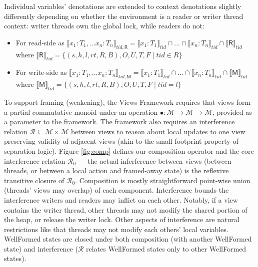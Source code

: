 Individual variables' denotations are extended to context denotations slightly differently depending on whether the environment is a reader or writer thread context: writer threads own the global lock, while readers do not:
\begin{itemize}
\item For read-side as $\llbracket x_1 : T_1, \ldots x_n : T_n \rrbracket_{tid,\textsf{R}} = \llbracket x_1 : T_1 \rrbracket_{tid} \cap \ldots \cap \llbracket x_n : T_n \rrbracket_{tid} \cap \llbracket \textsf{R} \rrbracket_{tid}$ where
$\llbracket \textsf{R} \rrbracket_{tid} = \{ (s,h,l,rt,R,B),O,U,T,F  \mid tid \in R \}$

\item For write-side as $\llbracket x_1 : T_1, \ldots x_n : T_n \rrbracket_{tid,\textsf{M}} = \llbracket x_1 : T_1 \rrbracket_{tid} \cap \ldots \cap \llbracket x_n : T_n \rrbracket_{tid} \cap \llbracket \textsf{M} \rrbracket_{tid}$ where
$\llbracket \textsf{M} \rrbracket_{tid} = \{ (s,h,l,rt,R,B),O,U,T,F  \mid tid = l \}$
%
\end{itemize}

 To support framing (weakening), the Views Framework requires that views form a partial commutative monoid under an operation $\bullet : \mathcal{M} \longrightarrow \mathcal{M} \longrightarrow \mathcal{M}$, provided as a parameter to the framework.
The framework also requires an interference relation $\mathcal{R}\subseteq\mathcal{M}\times\mathcal{M}$ between views to reason about local updates to one view preserving validity of adjacent views (akin to the small-footprint property of separation logic).
Figure \ref{fig:comp} defines our composition operator and the core interference relation $\mathcal{R}_0$ --- the actual inferference between views (between threads, or between a local action and framed-away state) is the reflexive transitive closure of $\mathcal{R}_0$.
Composition is mostly straightforward point-wise union (threads' views may overlap) of each component.
Interference bounds the interference writers and readers may inflict on each other.  Notably, if a view contains the writer thread, other threads may not modify the shared portion of the heap, or release the writer lock.  Other aspects of interference are natural restrictions like that threads may not modify each others' local variables.
\textsf{WellFormed} states are closed under both composition (with another \textsf{WellFormed} state) and interference ($\mathcal{R}$ relates \textsf{WellFormed} states only to other \textsf{WellFormed} states).



